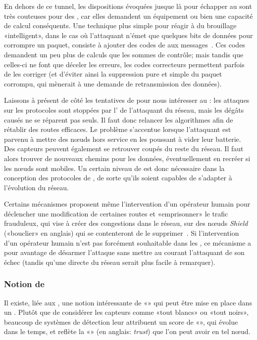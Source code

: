 En dehors de ce tunnel, les dispositions évoquées jusque là pour échapper au  sont très couteuses pour des \rcs, car elles demandent un équipement ou bien une capacité de calcul conséquents.
Une technique plus simple pour réagir à du brouillage «intelligent», dans le cas où l'attaquant n'émet que quelques bits de données pour corrompre un paquet, consiste à ajouter des codes de  aux messages~\cite{PI11}.
Ces codes demandent un peu plus de calculs que les sommes de contrôle; mais tandis que celles-ci ne font que déceler les erreurs, les codes correcteurs permettent parfois de les corriger (et d'éviter ainsi la suppression pure et simple du paquet corrompu, qui mènerait à une demande de retransmission des données).

Laissons à présent de côté les tentatives de  pour nous intéresser au : les attaques sur les protocoles sont stoppées par l' de l'attaquant du réseau, mais les dégâts causés ne se réparent pas seuls.
Il faut donc relancer les algorithmes afin de rétablir des routes efficaces.
Le problème s'accentue lorsque l'attaquant est parvenu à mettre des nœuds hors service en les poussant à vider leur batterie.
Des capteurs peuvent également se retrouver coupés du reste du réseau.
Il faut alors trouver de nouveaux chemins pour les données, éventuellement en recréer si les nœuds sont mobiles.
Un certain niveau de \resilience est donc nécessaire dans la conception des protocoles de , de sorte qu'ils soient capables de s'adapter à l'évolution du réseau.

Certains mécanismes proposent même l'intervention d'un opérateur humain pour déclencher une modification de certaines routes et «emprisonner» le trafic frauduleux, qui vise à créer des congestions dans le réseau, sur des nœuds \textit{Shield} («bouclier» en anglais) qui se contenteront de le supprimer~\cite{HSP13}.
Si l'intervention d'un opérateur humain n'est pas forcément souhaitable dans les \rcs, ce mécanisme a pour avantage de désarmer l'attaque sans mettre au courant l'attaquant de son échec (tandis qu'une  directe du réseau serait plus facile à remarquer).

    \subsubsection{Notion de }
Il existe, liée aux \IDS, une notion intéressante de «» qui peut être mise en place dans un \rc.
Plutôt que de considérer les capteurs comme «tout blancs» ou «tout noirs», beaucoup de systèmes de détection leur attribuent un score de «\reput», qui évolue dans le temps, et reflète la «» (en anglais: \textit{trust}) que l'on peut avoir en tel nœud.

